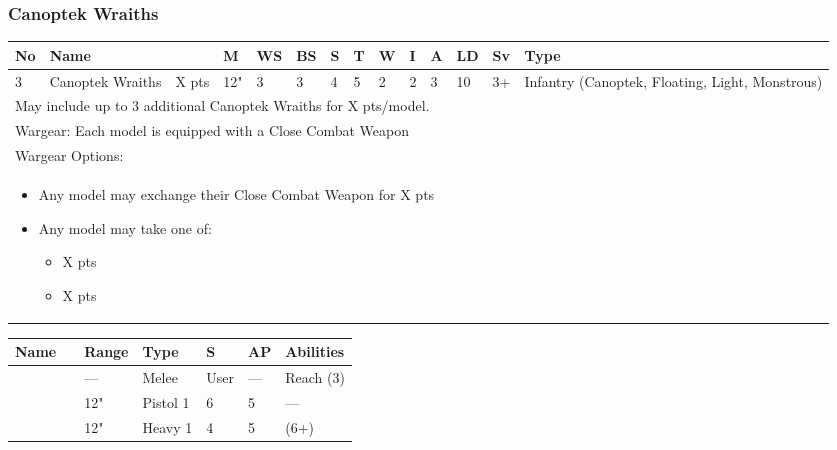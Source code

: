\newpage
\subsubsection{Canoptek Wraiths}

\noindent
\begin{tabular}{||m{10pt} m{95pt} m{30pt} m{11pt} m{11pt} m{11pt} m{11pt} m{11pt} m{11pt} m{11pt} m{11pt} m{11pt} m{11pt} m{125pt}||}
	\hline
	No & Name & & M & WS & BS & S & T & W & I & A & LD & Sv & Type \\
	\hline
	3 & Canoptek Wraiths & X pts & 12" & 3 & 3 & 4 & 5 & 2 & 2 & 3 & 10 & 3+ & Infantry (Canoptek, Floating, Light, Monstrous)\\
	\hline
	\hline
	\multicolumn{14}{||Z{532 pt}||}{May include up to 3 additional Canoptek Wraiths for X pts/model.}\\		
	\hline
	\hline
	\multicolumn{14}{||Z{532 pt}||}{Wargear: Each model is equipped with a Close Combat Weapon}\\
	\multicolumn{14}{||Z{532 pt}||}{Wargear Options:} \\	\multicolumn{14}{||Z{532 pt}||}{\begin{itemize}
			\item Any model may exchange their Close Combat Weapon for \quickref{Whip Coils} \hrulefill X pts
			\item Any model may take one of:
			\begin{itemize}
				\item \quickref{Particle Caster} \hrulefill X pts
				\item \quickref{Transdimensional Beamer} \hrulefill X pts
			\end{itemize}
	\end{itemize}} \\
	\hline
\end{tabular}

\noindent
\begin{tabular}{||m{110pt} m{30pt} m{31pt} m{55pt} m{12pt} m{12pt} m{210pt}||}
	\hline
	Name & & Range & Type & S & AP & Abilities \\
	\hline
	\quickref{Whip Coils} & & — & Melee & User & — & Reach (3) \\
	\quickref{Particle Caster} & & 12" & Pistol 1 & 6 & 5 & — \\
	\quickref{Transdimensional Beamer} & & 12" & Heavy 1 & 4 & 5 & \quickref{Exile Ray} (6+) \\
	\hline
\end{tabular}

